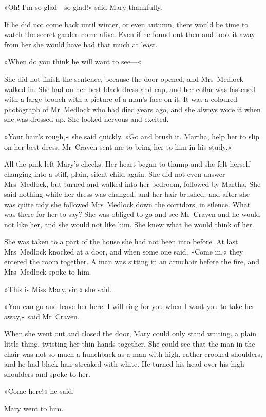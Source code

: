 »Oh! I'm so glad—so glad!« said Mary thankfully.

If he did not come back until winter, or even autumn, there would be time to watch the secret garden come alive. Even if he found out then and took it away from her she would have had that much at least.

»When do you think he will want to see—«

She did not finish the sentence, because the door opened, and Mrs~Medlock walked in. She had on her best black dress and cap, and her collar was fastened with a large brooch with a picture of a man's face on it. It was a coloured photograph of Mr~Medlock who had died years ago, and she always wore it when she was dressed up. She looked nervous and excited.

»Your hair's rough,« she said quickly. »Go and brush it. Martha, help her to slip on her best dress. Mr~Craven sent me to bring her to him in his study.«

All the pink left Mary's cheeks. Her heart began to thump and she felt herself changing into a stiff, plain, silent child again. She did not even answer Mrs~Medlock, but turned and walked into her bedroom, followed by Martha. She said nothing while her dress was changed, and her hair brushed, and after she was quite tidy she followed Mrs~Medlock down the corridors, in silence. What was there for her to say? She was obliged to go and see Mr~Craven and he would not like her, and she would not like him. She knew what he would think of her.

She was taken to a part of the house she had not been into before. At last Mrs~Medlock knocked at a door, and when some one said, »Come in,« they entered the room together. A man was sitting in an armchair before the fire, and Mrs~Medlock spoke to him.

»This is Miss Mary, sir,« she said.

»You can go and leave her here. I will ring for you when I want you to take her away,« said Mr~Craven.

When she went out and closed the door, Mary could only stand waiting, a plain little thing, twisting her thin hands together. She could see that the man in the chair was not so much a hunchback as a man with high, rather crooked shoulders, and he had black hair streaked with white. He turned his head over his high shoulders and spoke to her.

»Come here!« he said.

Mary went to him.

